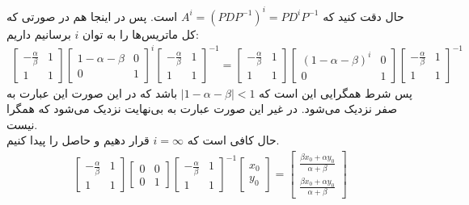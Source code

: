 حال دقت کنید که
$A^i = (PDP^{-1})^i = PD^iP^{-1}$
است. پس در اینجا هم در صورتی که کل ماتریس‌ها را به توان
$i$
برسانیم داریم:
\begin{gather*}
    \begin{bmatrix}
        -\frac{\alpha}{\beta} & 1\\
        1 & 1
    \end{bmatrix}
    \begin{bmatrix}
        1 - \alpha - \beta & 0\\
        0 & 1
    \end{bmatrix} ^ i
    \begin{bmatrix}
        -\frac{\alpha}{\beta} & 1\\
        1 & 1
    \end{bmatrix} ^ {-1}
    =
    \begin{bmatrix}
        -\frac{\alpha}{\beta} & 1\\
        1 & 1
    \end{bmatrix}
    \begin{bmatrix}
        (1 - \alpha - \beta)^i & 0\\
        0 & 1
    \end{bmatrix}
    \begin{bmatrix}
        -\frac{\alpha}{\beta} & 1\\
        1 & 1
    \end{bmatrix} ^ {-1}
\end{gather*}
پس شرط همگرایی این است که
$|1 - \alpha - \beta| < 1$
باشد که در این صورت این عبارت به صفر نزدیک می‌شود. در غیر این صورت عبارت به بی‌نهایت نزدیک می‌شود که همگرا نیست.
\\
حال کافی است که
$i = \infty$
قرار دهیم و حاصل را پیدا کنیم.
\begin{gather*} %
    \begin{bmatrix}
        -\frac{\alpha}{\beta} & 1\\
        1 & 1
    \end{bmatrix}
    \begin{bmatrix}
        0 & 0\\
        0 & 1
    \end{bmatrix}
    \begin{bmatrix}
        -\frac{\alpha}{\beta} & 1\\
        1 & 1
    \end{bmatrix} ^ {-1}
    \begin{bmatrix}
        x_0\\
        y_0
    \end{bmatrix}
    = \begin{bmatrix}
        \frac{\beta x_0 + \alpha y_0}{\alpha + \beta}\\
        \frac{\beta x_0 + \alpha y_0}{\alpha + \beta}
    \end{bmatrix}
\end{gather*}